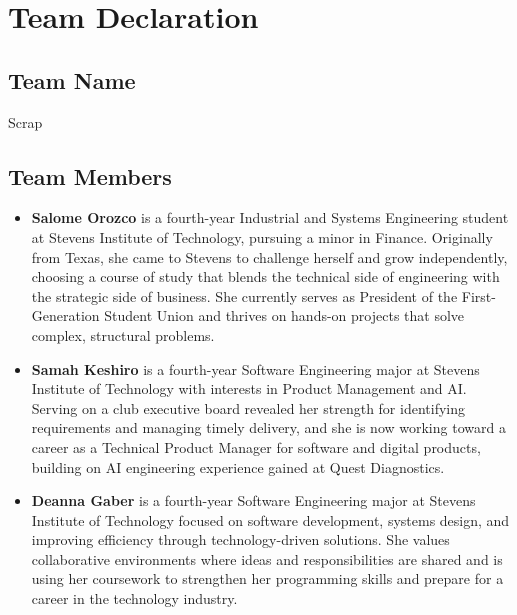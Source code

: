 \chapter{Team Declaration}

\section{Team Name}
\noindent Scrap

\section{Team Members}
\noindent
\begin{itemize}[leftmargin=1.4em]
\item \textbf{Salome Orozco} is a fourth-year Industrial and Systems Engineering student at Stevens Institute of Technology, pursuing a minor in Finance. Originally from Texas, she came to Stevens to challenge herself and grow independently, choosing a course of study that blends the technical side of engineering with the strategic side of business. She currently serves as President of the First-Generation Student Union and thrives on hands-on projects that solve complex, structural problems.

\item \textbf{Samah Keshiro} is a fourth-year Software Engineering major at Stevens Institute of Technology with interests in Product Management and AI. Serving on a club executive board revealed her strength for identifying requirements and managing timely delivery, and she is now working toward a career as a Technical Product Manager for software and digital products, building on AI engineering experience gained at Quest Diagnostics.

\item \textbf{Deanna Gaber} is a fourth-year Software Engineering major at Stevens Institute of Technology focused on software development, systems design, and improving efficiency through technology-driven solutions. She values collaborative environments where ideas and responsibilities are shared and is using her coursework to strengthen her programming skills and prepare for a career in the technology industry.
\end{itemize}

